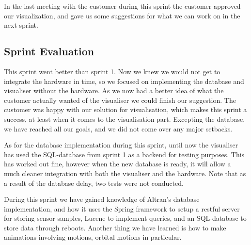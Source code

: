 \documentclass[../document]{subfiles}
\begin{document}
In the last meeting with the customer during this sprint the customer approved our visualization, and gave us some suggestions for what we can work on in the next sprint.  

\subsection{Sprint Evaluation}
This sprint went better than sprint 1. Now we knew we would not get to integrate the hardware in time, so we focused on implementing the database and visualiser without the hardware. As we now had a better idea of what the customer actually wanted of the visualiser we could finish our suggestion. The customer was happy with our solution for visualisation, which makes this sprint a success, at least when it comes to the visualisation part. Excepting the database, we have reached all our goals, and we did not come over any major setbacks.

As for the database implementation during this sprint, until now the visualiser has used the \gls{SQL}-database from sprint 1 as a backend for testing purposes. This has worked out fine, however when the new database is ready, it will allow a much cleaner integration with both the visualiser and the hardware. Note that as a result of the database delay, two tests were not conducted.

During this sprint we have gained knowledge of Altran’s database implementation, and how it uses the Spring framework to setup a restful server for storing sensor samples, Lucene to implement queries, and an \gls{SQL}-database to store data through reboots. Another thing we have learned is how to make animations involving motions, orbital motions in particular.
\end{document}
